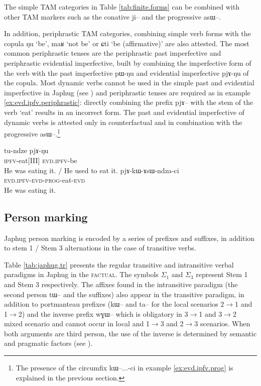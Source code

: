 \documentclass[oldfontcommands,oneside,a4paper,11pt]{article}
\newcommand{\ipa}[1]{{\phon #1}} %
\newcommand{\siga}{$\Sigma_1$}
\newcommand{\sigc}{$\Sigma_3$}
\begin{document}
The simple TAM categories in Table \ref{tab:finite.forms} can be combined with other TAM markers such as the conative \ipa{ji--} and the progressive \ipa{asɯ--}. 

In addition, periphrastic TAM categories, combining simple verb forms with the copula \ipa{ŋu} `be', \ipa{maʁ} `not be' or \ipa{ɕti} `be (affirmative)' are also attested. The most common periphrastic tenses are the periphrastic past imperfective and periphrastic evidential imperfective, built by combining the imperfective form of the verb with the past imperfective \ipa{pɯ-ŋu} and evidential imperfective \ipa{pjɤ-ŋu} of the copula. Most dynamic verbs cannot be used in the simple past and evidential imperfective in Japhug (see \citealt{lin11direction}) and periphrastic tenses are required as in example \ref{ex:evd.ipfv.periphrastic}: directly combining the prefix \ipa{pjɤ--} with the stem of the verb `eat' results  in an incorrect form. The past and evidential imperfective of dynamic verbs is attested only in counterfactual and in combination with the progressive \ipa{asɯ--}.\footnote{The presence of the circumfix \ipa{kɯ--...-ci} in example \ref{ex:evd.ipfv.prog} is explained in the previous section.}

\begin{exe}
\ex \label{ex:evd.ipfv.periphrastic}
\gll
\ipa{tu-ndze} \ipa{pjɤ-ŋu} \\
 \textsc{ipfv}-eat[III] \textsc{evd.ipfv}-be \\
\glt He was eating it. / He used to eat it.
\ex \label{ex:evd.ipfv.prog}
\gll
 \ipa{pjɤ-kɯ-ɤsɯ-ndza-ci} \\
 \textsc{evd.ipfv-evd-prog}-eat-\textsc{evd} \\
\glt He was eating it.
\end{exe}



\subsection{Person marking}
Japhug person marking is encoded by a series of prefixes and suffixes, in addition to stem 1 / Stem 3 alternations in the case of transitive verbs.

Table \ref{tab:japhug.tr} presents the regular transitive and intransitive verbal paradigms in Japhug in the \textsc{factual}. The symbols \siga{} and \sigc{} represent Stem 1 and Stem 3 respectively. The affixes found in the intransitive paradigm (the second person \ipa{tɯ--} and the suffixes) also appear in the transitive paradigm, in addition to portmanteau prefixes (\ipa{kɯ--} and \ipa{ta--} for the local scenarios 2$\rightarrow$1 and 1$\rightarrow$2) and the inverse prefix \ipa{wɣɯ--} which is obligatory in 3$\rightarrow$1 and 3$\rightarrow$2 mixed scenario and cannot occur in local and 1$\rightarrow$3 and 2$\rightarrow$3 scenarios. When both arguments are third person, the use of the inverse is determined by semantic and pragmatic factors (see \citealt{jacques10inverse}).
\end{document}
